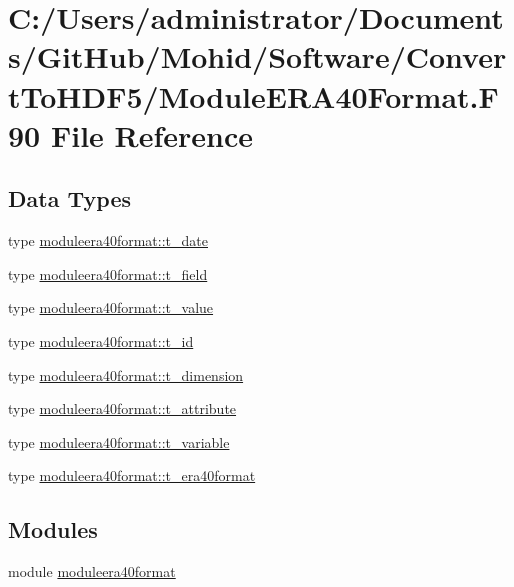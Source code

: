 \hypertarget{_module_e_r_a40_format_8_f90}{}\section{C\+:/\+Users/administrator/\+Documents/\+Git\+Hub/\+Mohid/\+Software/\+Convert\+To\+H\+D\+F5/\+Module\+E\+R\+A40\+Format.F90 File Reference}
\label{_module_e_r_a40_format_8_f90}
\subsection*{Data Types}
\begin{DoxyCompactItemize}
\item 
type \mbox{\hyperlink{structmoduleera40format_1_1t__date}{moduleera40format\+::t\+\_\+date}}
\item 
type \mbox{\hyperlink{structmoduleera40format_1_1t__field}{moduleera40format\+::t\+\_\+field}}
\item 
type \mbox{\hyperlink{structmoduleera40format_1_1t__value}{moduleera40format\+::t\+\_\+value}}
\item 
type \mbox{\hyperlink{structmoduleera40format_1_1t__id}{moduleera40format\+::t\+\_\+id}}
\item 
type \mbox{\hyperlink{structmoduleera40format_1_1t__dimension}{moduleera40format\+::t\+\_\+dimension}}
\item 
type \mbox{\hyperlink{structmoduleera40format_1_1t__attribute}{moduleera40format\+::t\+\_\+attribute}}
\item 
type \mbox{\hyperlink{structmoduleera40format_1_1t__variable}{moduleera40format\+::t\+\_\+variable}}
\item 
type \mbox{\hyperlink{structmoduleera40format_1_1t__era40format}{moduleera40format\+::t\+\_\+era40format}}
\end{DoxyCompactItemize}
\subsection*{Modules}
\begin{DoxyCompactItemize}
\item 
module \mbox{\hyperlink{namespacemoduleera40format}{moduleera40format}}
\end{DoxyCompactItemize}
